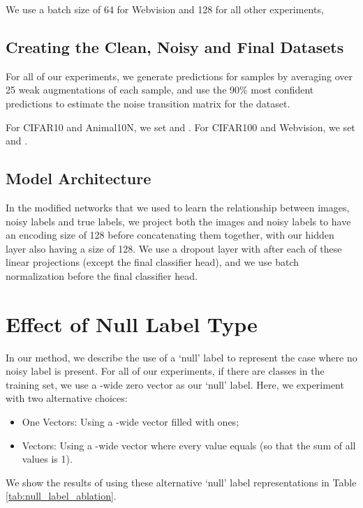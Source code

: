 \documentclass[10pt,twocolumn,letterpaper]{article}
\begin{document}
We use a batch size of 64 for Webvision and 128 for all other experiments,

\subsection{Creating the Clean, Noisy and Final Datasets}

For all of our experiments, we generate predictions for samples by averaging over 25 weak augmentations of each sample, and use the 90\% most confident predictions to estimate the noise transition matrix for the dataset.

For CIFAR10 and Animal10N, we set  and . For CIFAR100 and Webvision, we set  and .


\subsection{Model Architecture}

In the modified networks that we used to learn the relationship between images, noisy labels and true labels, we project both the images and noisy labels to have an encoding size of 128 before concatenating them together, with our hidden layer also having a size of 128. We use a dropout layer with  after each of these linear projections (except the final classifier head), and we use batch normalization before the final classifier head. 

\section{Effect of Null Label Type}

In our method, we describe the use of a `null' label to represent the case where no noisy label is present. For all of our experiments, if there are  classes in the training set, we use a -wide zero vector as our `null' label. Here, we experiment with two alternative choices:

\begin{itemize}
    \item One Vectors: Using a -wide vector filled with ones;
    \item  Vectors: Using a -wide vector where every value equals  (so that the sum of all values is 1).
\end{itemize}

We show the results of using these alternative `null' label representations in Table \ref{tab:null_label_ablation}.
\end{document}
